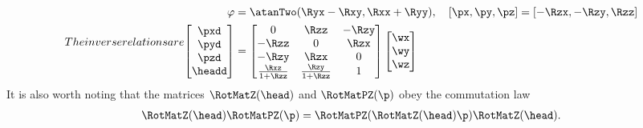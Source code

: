 \begin{subequations}
\begin{align}
\end{align}
The inverse relations are
\begin{align}
 \varphi &= \atanTwo(\Ryx-\Rxy, \Rxx+\Ryy),
\quad 
 [\px, \py, \pz] = [-\Rzx, -\Rzy, \Rzz]
\\
 \begin{bmatrix} \pxd \\ \pyd \\ \pzd \\ \headd \end{bmatrix}
 &=
 \begin{bmatrix}
  0 & \Rzz & -\Rzy \\
  -\Rzz & 0 & \Rzx \\
  -\Rzy & \Rzx & 0 \\
  \tfrac{\Rxz}{1+\Rzz} & \tfrac{\Rzy}{1+\Rzz} & 1 \\
 \end{bmatrix}
 \begin{bmatrix} \wx \\ \wy \\ \wz \end{bmatrix}
\end{align}
\end{subequations}
It is also worth noting that the matrices $\RotMatZ(\head)$ and $\RotMatPZ(\p)$ obey the commutation law
\begin{align}\label{eq:CommutativityAttitudeDecompostion}
 \RotMatZ(\head) \RotMatPZ(\p) = \RotMatPZ(\RotMatZ(\head) \p) \RotMatZ(\head).
\end{align}


